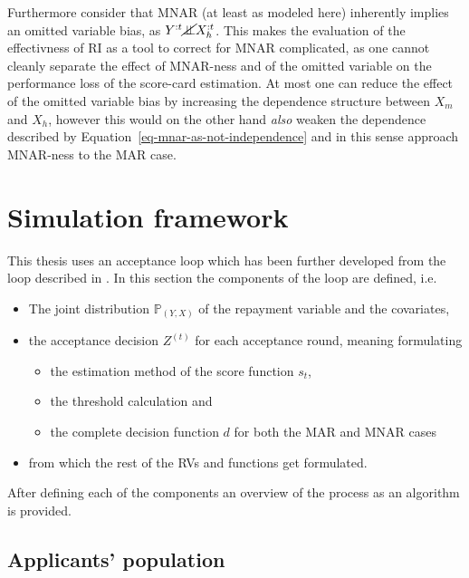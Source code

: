 \documentclass[
  12pt,
]{article}
\providecommand{\tightlist}{%
  \setlength{\itemsep}{0pt}\setlength{\parskip}{0pt}}
\begin{document}
Furthermore consider that MNAR (at least as modeled here) inherently
implies an omitted variable bias, as
\(Y^{:t} \cancel{\perp\!\!\!\perp} X_h^{:t}\). This makes the evaluation
of the effectivness of RI as a tool to correct for MNAR complicated, as
one cannot cleanly separate the effect of MNAR-ness and of the omitted
variable on the performance loss of the score-card estimation. At most
one can reduce the effect of the omitted variable bias by increasing the
dependence structure between \(X_m\) and \(X_h\), however this would on
the other hand \emph{also} weaken the dependence described by
Equation~\ref{eq-mnar-as-not-independence} and in this sense approach
MNAR-ness to the MAR case.

\newpage{}

\section{Simulation framework}\label{simulation-framework}

This thesis uses an acceptance loop which has been further developed
from the loop described in \textcite{kozdoi_et_al_BE_BASL}. In this
section the components of the loop are defined, i.e.

\begin{itemize}
\tightlist
\item
  The joint distribution \(\mathbb{P}_{(Y, X)}\) of the repayment
  variable and the covariates,
\item
  the acceptance decision \(Z^{(t)}\) for each acceptance round, meaning
  formulating

  \begin{itemize}
  \tightlist
  \item
    the estimation method of the score function \(s_t\),
  \item
    the threshold calculation and
  \item
    the complete decision function \(d\) for both the MAR and MNAR cases
  \end{itemize}
\item
  from which the rest of the RVs and functions get formulated.
\end{itemize}

After defining each of the components an overview of the process as an
algorithm is provided.

\subsection{Applicants' population}\label{sec-app-population-simulation}
\end{document}
